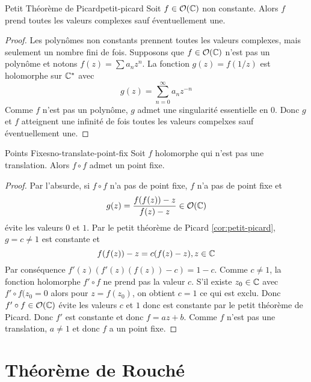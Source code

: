 \documentclass{cours}
\begin{document}
\begin{corollaire}
	{Petit Théorème de Picard}{petit-picard}
	Soit $f \in \mathcal{O}(\mathbb{C})$ non constante. Alors $f$ prend toutes les valeurs complexes sauf éventuellement une. 
\end{corollaire}
\begin{proof}
	Les polynômes non constants prennent toutes les valeurs complexes, mais seulement un nombre fini de fois. 
	Supposons que $f \in \mathcal{O}(\mathbb{C})$ n'est pas un polynôme et notons $f(z) = \sum a_{n}z^{n}$. 
	La fonction $g(z) = f(1/z)$ est holomorphe sur $\mathbb{C}^{*}$ avec 
	\begin{equation*}
		g(z) = \sum_{n = 0}^{\infty} a_{n}z^{-n}
	\end{equation*}
	Comme $f$ n'est pas un polynôme, $g$ admet une singularité essentielle en $0$. 
	Donc $g$ et $f$ atteignent une infinité de fois toutes les valeurs compelxes sauf éventuellement une. 
\end{proof}

\begin{corollaire}
	{Points Fixes}{no-translate-point-fix}
	Soit $f$ holomorphe qui n'est pas une translation. Alors $f \circ f$ admet un point fixe.
\end{corollaire}
\begin{proof}
	Par l'absurde, si $f \circ f$ n'a pas de point fixe, $f$ n'a pas de point fixe et 
	\begin{equation*}
		g(z) = \frac{f(f(z)) - z}{f(z) - z} \in \mathcal{O}(\mathbb{C})
	\end{equation*}
	évite les valeurs $0$ et $1$. 
	Par le petit théorème de Picard \ref{cor:petit-picard}, $g = c \neq 1$ est constante et 
	\begin{equation*}
		f(f(z)) - z = c(f(z) - z), z \in \mathbb{C}
	\end{equation*}
	Par conséquence $f'(z)(f'(z)(f(z)) - c) = 1 - c$. 
	Comme $c \neq 1$, la fonction holomorphe $f'\circ f$ ne prend pas la valeur $c$. S'il existe $z_{0} \in \mathbb{C}$
	avec $f'\circ f(z_{0} = 0$ alors pour $z = f(z_{0})$, on obtient $c = 1$ ce qui est exclu. 
		Donc $f' \circ f \in \mathcal{O}(\mathbb{C})$ évite les valeurs $c$ et $1$ donc est constante par le petit théorème de Picard. 
	Donc $f'$ est constante et donc $f = az + b$. Comme $f$ n'est pas une translation, $a \neq 1$ et donc $f$ a un point fixe. 
\end{proof}


\section{Théorème de Rouché}
\end{document}
